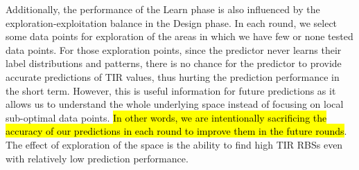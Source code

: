 \documentclass{article}
\begin{document}
Additionally, the
performance of the Learn phase
is also influenced by the exploration-exploitation balance in the Design phase.
In each round, we select some data points for exploration of the areas in which we have few or none tested data points.
For those exploration points, since the predictor never learns their label distributions and patterns, there is no chance for the predictor to provide accurate predictions of TIR values,
thus hurting the prediction performance in the short term.
However, this is useful information for future predictions as it allows us to understand the whole underlying space instead of focusing on local sub-optimal data points.
\hl{In other words, we are intentionally sacrificing the accuracy of our predictions in each round to improve them in the future rounds}.
The effect of exploration of the space is the ability to find high TIR RBSs even with relatively low prediction performance.\\
\end{document}
